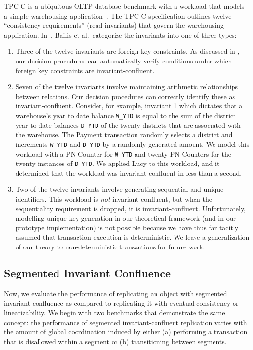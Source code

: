 \example[TPC-C]
TPC-C is a ubiquitous OLTP database benchmark with a workload that models a
simple warehousing application~\cite{difallah2013oltp}. The TPC-C specification
outlines twelve ``consistency requirements'' (read invariants) that govern the
warehousing application. In~\cite{bailis2014coordination}, Bailis et al.\
categorize the invariants into one of three types:
\begin{enumerate}
  \item
    Three of the twelve invariants are foreign key constraints.  As discussed
    in \exampleref{ForeignKeysEval}, our decision procedures can automatically
    verify conditions under which foreign key constraints are
    invariant-confluent.

  \item
    \newcommand{\ttt}[1]{{\smaller \texttt{#1}}}
    Seven of the twelve invariants involve maintaining arithmetic relationships
    between relations. Our decision procedures can correctly identify these as
    invariant-confluent. Consider, for example, invariant 1 which dictates that
    a warehouse's year to date balance \ttt{W\_YTD} is equal to the sum of the
    district year to date balances \ttt{D\_YTD} of the twenty districts that
    are associated with the warehouse. The Payment transaction randomly selects
    a district and increments \ttt{W\_YTD} and \ttt{D\_YTD} by a randomly
    generated amount. We model this workload with a PN-Counter for \ttt{W\_YTD}
    and twenty PN-Counters for the twenty instances of \ttt{D\_YTD}. We applied
    Lucy to this workload, and it determined that the workload was
    invariant-confluent in less than a second.

  \item
    Two of the twelve invariants involve generating sequential and unique
    identifiers. This workload is \emph{not} invariant-confluent, but when the
    sequentiality requirement is dropped, it is invariant-confluent.
    Unfortunately, modelling unique key generation in our theoretical framework
    (and in our prototype implementation) is not possible because we have thus
    far tacitly assumed that transaction execution is deterministic. We leave a
    generalization of our theory to non-deterministic transactions for future
    work.
\end{enumerate}

\subsection{Segmented Invariant Confluence}%
Now, we evaluate the performance of replicating an object with segmented
invariant-confluence as compared to replicating it with eventual consistency or
linearizability. We begin with two benchmarks that demonstrate the same
concept: the performance of segmented invariant-confluent replication varies
with the amount of global coordination induced by either (a) performing a
transaction that is disallowed within a segment or (b) transitioning between
segments.

